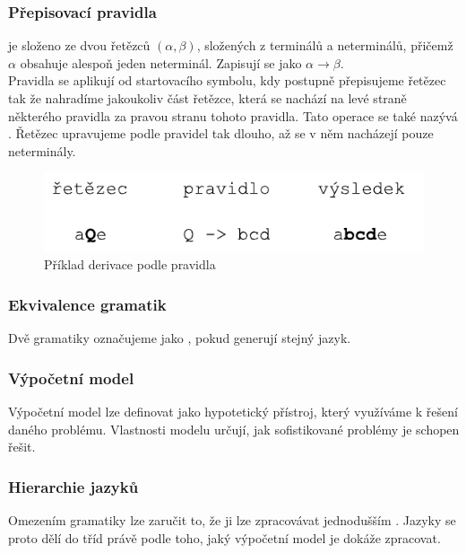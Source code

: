 \subsubsection*{Přepisovací pravidla}
\label{term:rewriteRule}

 je složeno ze dvou řetězců $(\alpha, \beta)$,
složených z terminálů a neterminálů, přičemž $\alpha$ obsahuje alespoň jeden neterminál.
Zapisují se jako $\alpha \rightarrow \beta$.\\
Pravidla se aplikují od startovacího symbolu, kdy postupně přepisujeme řetězec tak že nahradíme
jakoukoliv část řetězce, která se nachází na levé straně některého pravidla za pravou stranu tohoto pravidla.
Tato operace se také nazývá .
Řetězec upravujeme podle pravidel tak dlouho, až se v něm nacházejí pouze neterminály.

\begin{figure}[H]
  \centering
  \includegraphics{fig/rewriteRule.pdf}
  \caption{Příklad derivace podle pravidla}
  \label{img:rewriteRule}
\end{figure}

\subsubsection*{Ekvivalence gramatik}
Dvě gramatiky označujeme jako , pokud generují stejný jazyk.

\subsubsection*{Výpočetní model}

Výpočetní model lze definovat jako hypotetický přístroj,
který využíváme k řešení daného problému. Vlastnosti modelu určují,
jak sofistikované problémy je schopen řešit.

\subsubsection*{Hierarchie jazyků} \label{chomsky:hierarchy}

Omezením gramatiky lze zaručit to, že ji lze zpracovávat jednodušším
. Jazyky se proto
dělí do tříd právě podle toho, jaký výpočetní model je dokáže zpracovat.\\

